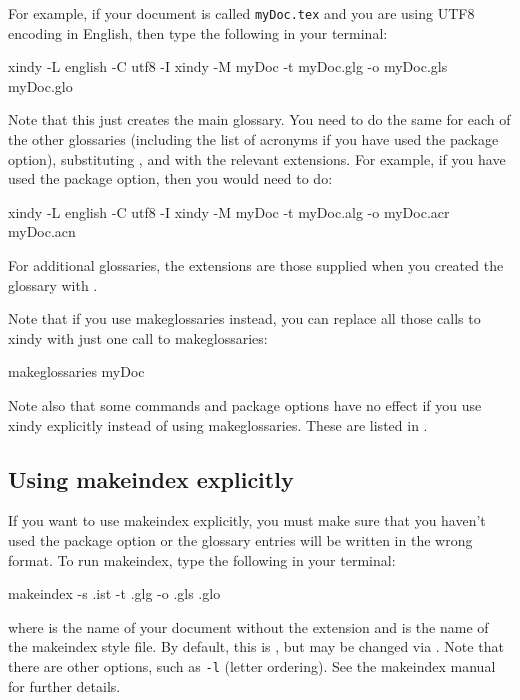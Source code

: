 \documentclass[report]{nlctdoc}
\begin{document}
For example, if your document is called \texttt{myDoc.tex} and
you are using UTF8 encoding in English, then type the
following in your terminal:
\begin{prompt}
xindy -L english -C utf8 -I xindy -M myDoc -t myDoc.glg -o myDoc.gls myDoc.glo
\end{prompt}

Note that this just creates the main glossary. You need to do
the same for each of the other glossaries (including the
list of acronyms if you have used the 
package option), substituting , 
and  with the relevant extensions. For example,
if you have used the  package option, then 
you would need to do:
\begin{prompt}
xindy -L english -C utf8 -I xindy -M myDoc -t myDoc.alg -o myDoc.acr myDoc.acn
\end{prompt}
For additional glossaries, the extensions are those supplied
when you created the glossary with .

Note that if you use \gls{makeglossaries} instead, you can
replace all those calls to \gls{xindy} with just one call
to \gls*{makeglossaries}:
\begin{prompt}
makeglossaries myDoc
\end{prompt}
Note also that some commands and package options have no effect if 
you use \gls{xindy} explicitly instead of using 
\gls*{makeglossaries}. These are listed in 
.


\subsection{Using makeindex explicitly}
\label{sec:makeindexapp}

If you want to use \gls{makeindex} explicitly, you must
make sure that you haven't used the  package
option or the glossary entries will be written in the wrong
format. To run \gls*{makeindex}, type the following in
your terminal:
\begin{prompt}
makeindex -s .ist -t .glg -o .gls .glo
\end{prompt}
where  is the name of your document without the
 extension and  is the 
name of the \gls{makeindex} style file. By default, this is
, but may be changed via
. Note that there are other options, 
such as \texttt{-l} (letter ordering). See the \gls*{makeindex}
manual for further details.
\end{document}

